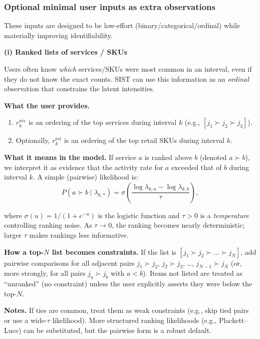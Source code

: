 \documentclass[11pt]{article}
\begin{document}
\subsubsection*{Optional minimal user inputs as extra observations}

These inputs are designed to be low-effort (binary/categorical/ordinal) while materially improving identifiability.

\textbf{(i) Ranked lists of services / SKUs}

Users often know \emph{which} services/SKUs were most common in an interval, even if they do not know the exact counts.
SIST can use this information as an \emph{ordinal} observation that constrains the latent intensities.

\textbf{What the user provides.}
\begin{enumerate}
  \item $r^{\mathrm{svc}}_k$ is an ordering of the top services during interval $k$ (e.g., $[j_1 \succ j_2 \succ j_3]$).
  \item Optionally, $r^{\mathrm{ret}}_k$ is an ordering of the top retail SKUs during interval $k$.
\end{enumerate}

\textbf{What it means in the model.} If service $a$ is ranked above $b$ (denoted $a\succ b$), we interpret it as evidence that the activity rate for $a$ exceeded that of $b$ during interval $k$.
A simple (pairwise) likelihood is:
\[
  P(a \succ b \mid \lambda_{k,*}) = \sigma\!\left(\frac{\log \lambda_{k,a} - \log \lambda_{k,b}}{\tau}\right),
\]

where $\sigma(u)=1/(1+e^{-u})$ is the logistic function and $\tau>0$ is a \emph{temperature} controlling ranking noise.
As $\tau\to 0$, the ranking becomes nearly deterministic; larger $\tau$ makes rankings less informative.

\textbf{How a top-$N$ list becomes constraints.} If the list is $[j_1 \succ j_2 \succ \dots \succ j_N]$, add pairwise comparisons for all adjacent pairs $j_1\succ j_2$, $j_2\succ j_3$, \dots, $j_{N-1}\succ j_N$ (or, more strongly, for all pairs $j_a\succ j_b$ with $a<b$).
Items not listed are treated as ``unranked'' (no constraint) unless the user explicitly asserts they were below the top-$N$.

\textbf{Notes.} If ties are common, treat them as weak constraints (e.g., skip tied pairs or use a wide-$\tau$ likelihood).
More structured ranking likelihoods (e.g., Plackett--Luce) can be substituted, but the pairwise form is a robust default.
\end{document}
